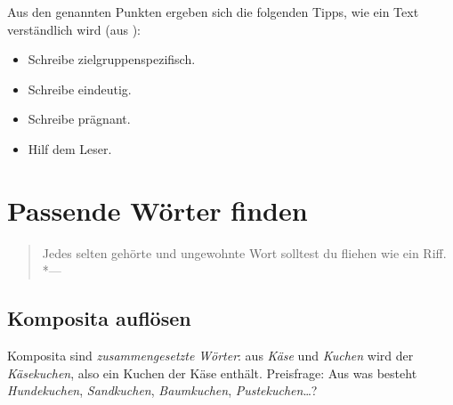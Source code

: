 \documentclass[a4paper,titlepage=true,twoside]{scrartcl}
\newenvironment{epigraph}[1]%
{\sbox{\Epigraph}{\textit{#1}}
\begin{quote}}%
{%
\\*\hspace{0pt}---\usebox{\Epigraph}%
\end{quote}}
\begin{document}
Aus den genannten Punkten ergeben sich die folgenden Tipps, wie ein Text
verständlich wird (aus \cite{bib.rosenberg}):

\begin{itemize}
 \item Schreibe zielgruppenspezifisch.
 \item Schreibe eindeutig.
 \item Schreibe prägnant.
 \item Hilf dem Leser.
\end{itemize}


% 
% 
% 


\section{Passende Wörter finden}
\begin{epigraph}{Cäsar}
 Jedes selten gehörte und ungewohnte Wort solltest du fliehen wie ein Riff.
\end{epigraph}



\subsection{Komposita auflösen}
Komposita sind \emph{zusammengesetzte Wörter}: aus \emph{Käse} und \emph{Kuchen}
wird der \emph{Käsekuchen}, also ein Kuchen der Käse enthält. Preisfrage: Aus was 
besteht \emph{Hundekuchen}, \emph{Sandkuchen}, \emph{Baumkuchen}, 
\emph{Pustekuchen}\ldots?
\end{document}
